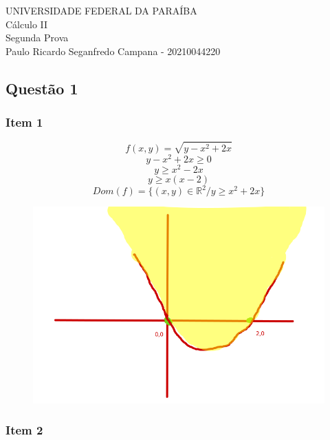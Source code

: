 \documentclass[12pt]{article}
\begin{document}
\setcounter{secnumdepth}{0}
\begin{center}
	UNIVERSIDADE FEDERAL DA PARAÍBA\\
	Cálculo II\\
	Segunda Prova\\
	Paulo Ricardo Seganfredo Campana - 20210044220
\end{center}
\subsection{Questão 1}
\subsubsection{Item 1}

\[f(x,y) = \sqrt{y-x^{2}+2x}\]
\[y-x^{2}+2x \geq 0\]
\[y \geq x^{2}-2x\]
\[y \geq x(x-2)\]
\[Dom(f) = \lbrace (x,y) \in \mathds{R}^{2} / y\geq x^{2}+2x \rbrace\]
\begin{figure}[h!]
	\includegraphics[scale = 0.5]{q11}
\end{figure}

\subsubsection{Item 2}
\end{document}
